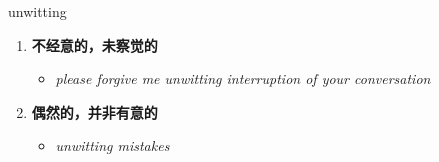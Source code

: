 
\begin{frame}
{\huge unwitting}
\begin{center}
\begin{enumerate}\Large
  \item \textbf{不经意的，未察觉的}
  \begin{itemize}
    \item \em{\Large{please forgive me unwitting interruption of your conversation}}
  \end{itemize}
  \item \textbf{偶然的，并非有意的}
  \begin{itemize}
    \item \em{\Large{unwitting mistakes}}
  \end{itemize}
\end{enumerate}
\end{center}
\end{frame}
